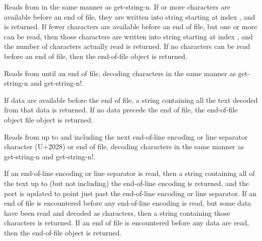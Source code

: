\begin{entry}{%
}


Reads from  in the same manner as {\cf
  get-string-n}.  If  or more characters are available
before an end of file, they are written into string
starting at index , and  is returned. If fewer
characters are available before an end of file, but one
or more can be read, then those characters are written into string
starting at index , and the number of characters actually read is
returned. If no characters can be read before an end of file,
then the end-of-file object is returned.
\end{entry}   

\begin{entry}{%
}
   
Reads from  until an end of file, decoding
characters in the same manner as {\cf get-string-n} and {\cf get-string-n!}.
   
If data are available before the end of file, a string
containing all the text decoded from that data is returned. If no data
precede the end of file, the end-of-file object file object is
returned.
\end{entry}

\begin{entry}{%
}
   
Reads from  up to and including the next
end-of-line encoding or line separator character (U+2028) or 
end of file, decoding characters in the same manner as {\cf
  get-string-n} and {\cf get-string-n!}.
   
If an end-of-line encoding or line separator is read, then a string
containing all of the text up to (but not including) the end-of-line
encoding is returned, and the port is updated to point just past the
end-of-line encoding or line separator. If an end of file is
encountered before any end-of-line encoding is read, but some data
have been read and decoded as characters, then a string containing
those characters is returned. If an end of file is encountered before
any data are read, then the end-of-file object is
returned.
\end{entry}

